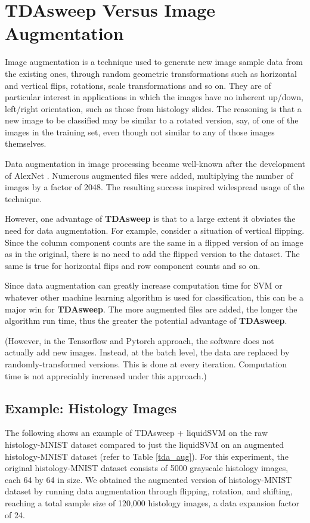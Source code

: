 \documentclass{article}
\begin{document}
\section{TDAsweep Versus Image Augmentation}
Image augmentation is a technique used to generate new image sample data from the existing ones, through random geometric transformations such as horizontal and vertical flips, rotations, scale transformations and so on. They are of particular interest in applications in which the images have no inherent up/down, left/right orientation, such as those from histology slides. The reasoning is that a new image to be classified may be similar to a rotated version, say, of one of the images in the training set, even though not similar to any of those images themselves.

Data augmentation in image processing became well-known after the development of AlexNet \cite{10.5555/2999134.2999257}. Numerous augmented files were added, multiplying the number of images by a factor of 2048. The resulting success inspired widespread usage of the technique.

However, one advantage of \textbf{TDAsweep} is that to a large extent it obviates the need for data augmentation. For example, consider a situation of vertical flipping. Since the column component counts are the same in a flipped version of an image as in the original, there is no need to add the flipped version to the dataset. The same is true for horizontal flips and row component counts and so on.

Since data augmentation can greatly increase computation time for SVM or whatever other machine learning algorithm is used for classification, this can be a major win for \textbf{TDAsweep}. The more augmented files are added, the longer the algorithm run time, thus the greater the potential advantage of \textbf{TDAsweep}.

(However, in the Tensorflow and Pytorch approach, the software does not actually add new images. Instead, at the batch level, the data are replaced by randomly-transformed versions. This is done at every iteration. Computation time is not appreciably increased under this approach.)

\subsection{Example: Histology Images}
The following shows an example of TDAsweep + liquidSVM on the raw histology-MNIST dataset compared to just the liquidSVM on an augmented histology-MNIST dataset (refer to Table \ref{tda_aug}). For this experiment, the original histology-MNIST dataset consists of 5000 grayscale histology images, each 64 by 64 in size. We obtained the augmented version of histology-MNIST dataset by running data augmentation through flipping, rotation, and shifting, reaching a total sample size of 120,000 histology images, a data expansion factor of 24.
\end{document}
